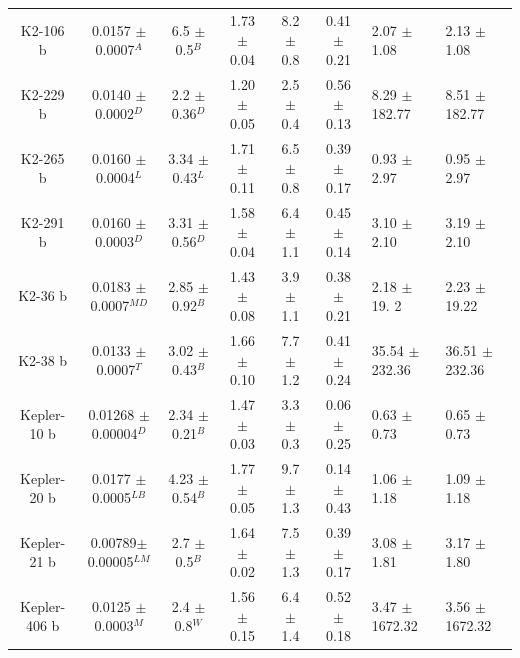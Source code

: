\documentclass[twocolumn]{aastex631}
\begin{document}
\begin{table}
\begin{centering}
\begin{tabular}{|c|c|c|c|c|c|h|h|}
K2-106 b     & 0.0157 $\pm$ 0.0007$^{A}$ & 6.5  $\pm$ 0.5$^{B}$  & 1.73 $\pm$ 0.04  & 8.2  $\pm$ 0.8    &  0.41 $\pm$ 0.21  & 2.07 $\pm$ 1.08 & 2.13 $\pm$ 1.08  \\ 
K2-229 b     & 0.0140 $\pm$ 0.0002$^{D}$ & 2.2 $\pm$ 0.36$^{D}$  & 1.20 $\pm$ 0.05  & 2.5  $\pm$ 0.4    &  0.56 $\pm$ 0.13  & 8.29 $\pm$ 182.77& 8.51 $\pm$ 182.77  \\ 
K2-265 b     & 0.0160 $\pm$ 0.0004$^{L}$ & 3.34 $\pm$ 0.43$^{L}$ & 1.71  $\pm$ 0.11 & 6.5  $\pm$ 0.8    &  0.39 $\pm$ 0.17  & 0.93 $\pm$ 2.97 & 0.95 $\pm$ 2.97   \\ 
K2-291 b     & 0.0160 $\pm$ 0.0003$^{D}$ & 3.31 $\pm$ 0.56$^{D}$ & 1.58 $\pm$ 0.04  & 6.4   $\pm$ 1.1   &  0.45 $\pm$ 0.14  & 3.10 $\pm$ 2.10 & 3.19 $\pm$ 2.10   \\ 
K2-36 b      & 0.0183 $\pm$ 0.0007$^{MD}$& 2.85 $\pm$ 0.92$^{B}$ & 1.43  $\pm$ 0.08 & 3.9   $\pm$ 1.1   &  0.38 $\pm$ 0.21  & 2.18 $\pm$ 19. 2& 2.23 $\pm$19.22   \\
K2-38 b      & 0.0133 $\pm$ 0.0007$^{T}$ & 3.02 $\pm$ 0.43$^{B}$ & 1.66 $\pm$ 0.10  & 7.7  $\pm$ 1.2    &  0.41  $\pm$ 0.24 & 35.54 $\pm$ 232.36& 36.51 $\pm$ 232.36  \\ 
Kepler-10 b  &0.01268 $\pm$ 0.00004$^{D}$& 2.34 $\pm$ 0.21$^{B}$ & 1.47  $\pm$ 0.03 & 3.3  $\pm$ 0.3    &  0.06 $\pm$ 0.25  & 0.63 $\pm$ 0.73 & 0.65 $\pm$ 0.73   \\ 
Kepler-20 b  & 0.0177 $\pm$ 0.0005$^{LB}$& 4.23 $\pm$ 0.54$^{B}$ & 1.77 $\pm$ 0.05  & 9.7  $\pm$ 1.3    &  0.14  $\pm$ 0.43 & 1.06 $\pm$ 1.18 & 1.09 $\pm$ 1.18   \\ 
Kepler-21 b  &0.00789$\pm$ 0.00005$^{LM}$& 2.7 $\pm$ 0.5$^{B}$   & 1.64 $\pm$  0.02 & 7.5  $\pm$ 1.3    &  0.39  $\pm$ 0.17 & 3.08 $\pm$ 1.81 & 3.17 $\pm$ 1.80   \\ 
Kepler-406 b & 0.0125 $\pm$ 0.0003$^{M}$ & 2.4 $\pm$ 0.8$^{W}$   & 1.56 $\pm$ 0.15  & 6.4 $\pm$ 1.4     &  0.52 $\pm$ 0.18  & 3.47 $\pm$ 1672.32 & 3.56 $\pm$ 1672.32 \\ 

\end{tabular}
\end{centering}
\end{table}
\end{document}
